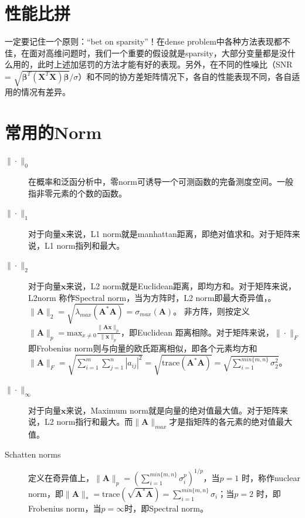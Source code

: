﻿\documentclass[hyperref,12pt]{ctexart}
\begin{document}
\section{性能比拼}
一定要记住一个原则：“bet on sparsity”！在dense problem中各种方法表现都不佳，在面对高维问题时，我们一个重要的假设就是sparsity，大部分变量都是没什么用的，此时上述加惩罚的方法才能有好的表现。另外，在不同的性噪比（SNR = $\sqrt{\boldsymbol{\beta}^T(\mathbf{X}^T\mathbf{X})\boldsymbol{\beta}}/\sigma$）和不同的协方差矩阵情况下，各自的性能表现不同，各自适用的情况有差异。

\section{常用的Norm}
\begin{description}
\item[$\|\cdot\|_0$] 在概率和泛函分析中，零norm可诱导一个可测函数的完备测度空间。一般指非零元素的个数的函数。
\item[$\|\cdot\|_1$] 对于向量$\mathbf{x}$来说，L1 norm就是manhattan距离，即绝对值求和。对于矩阵来说，L1 norm指列和最大。
\item[$\|\cdot\|_2$] 对于向量$\mathbf{x}$来说，L2 norm就是Euclidean距离，即均方和。对于矩阵来说，L2norm 称作Spectral norm，当为方阵时，L2 norm即最大奇异值，。$\|\mathbf{A}\|_2 = \sqrt{\lambda_{max}(\mathbf{A}^{*}\mathbf{A})} = \sigma_{max}(\mathbf{A})$。 非方阵，则按定义$\|\mathbf{A}\|_p = \text{max}_{x \neq 0}\frac{\|\mathbf{Ax}\|_p}{\|\mathbf{x}\|_p}$，即Euclidean 距离相除。对于矩阵来说，$\|\cdot\|_F$即Frobenius norm则与向量的欧氏距离相似，即各个元素均方和$\|\mathbf{A}\|_F = \sqrt{\sum^m_{i = 1}\sum^n_{j = 1}|a_{ij}|^2} = \sqrt{\text{trace}(\mathbf{A}^{*}\mathbf{A})} = \sqrt{\sum^{min\{m, n\}}_{i = 1}\sigma^2_2}$。
\item[$\|\cdot\|_{\infty}$] 对于向量$\mathbf{x}$来说，Maximum norm就是向量的绝对值最大值。对于矩阵来说，L2 norm指行和最大。而$\|\mathbf{A}\|_{max}$才是指矩阵的各元素的绝对值最大值。
\item[Schatten norms] 定义在奇异值上，$\|\mathbf{A}\|_p = (\sum^{min\{m,n\}}_{i = 1} \sigma_i^p)^{1/p}$，当$p = 1$ 时，称作nuclear norm，即$\|\mathbf{A}\|_{*} = \text{trace}(\sqrt{\mathbf{A}^{*}\mathbf{A}}) = \sum^{min\{m,n\}}_{i = 1} \sigma_i$；当$p = 2$ 时，即Frobenius norm，当$p = \infty$时，即Spectral norm。
\end{description}
\end{document}
